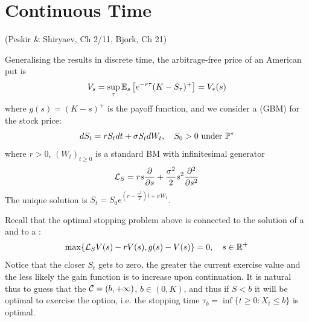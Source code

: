 \section{Continuous Time}

\begin{remark}
     (Peskir \& Shiryaev, Ch 2/11, Bjork, Ch 21)

    Generalising the results in discrete time, the arbitrage-free price of an American put is
    \[ V_s = \sup_{\tau} \mathbb E_s \left[ e^{-r\tau} (K - S_\tau)^+ \right] = V_*(s) \]
    where $g(s) = (K-s)^+$ is the payoff function, and we consider a  (GBM) for the stock price:
    \[ dS_t = r S_t dt + \sigma S_t dW_t, \quad S_0 > 0 \text{ under } \mathbb P^* \]
    where $r > 0$, $(W_t)_{t \geq 0}$ is a standard BM with infinitesimal generator
    \[ \mathcal{L}_S = r s \frac{\partial}{\partial s} + \frac{\sigma^2}{2} s^2 \frac{\partial^2}{\partial s^2} \]
    The unique solution is $S_t = S_0 e^{(r - \frac{\sigma^2}{2})t + \sigma W_t}$.

    Recall that the optimal stopping problem above is connected to the solution of a  and to a :
    \[ \max \{ \mathcal{L}_S V(s) - r V(s), g(s) - V(s) \} = 0, \quad s \in \mathbb R^+ \]
    Notice that the closer $S_t$ gets to zero, the greater the current exercise value and the less likely the gain function is to increase upon continuation. It is natural thus to guess that the  $\mathcal{C} = (b, +\infty)$, $b \in (0, K)$, and thus if $S < b$ it will be optimal to exercise the option, i.e. the stopping time $\tau_b = \inf \{ t \geq 0 : X_t \leq b \}$ is optimal.
\end{remark}

